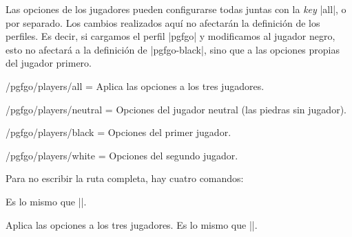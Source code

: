 \begin{goban}[9, stone = {radius = 4pt}, mark = {line = {color = red}}]
Las opciones de los jugadores pueden configurarse todas juntas con la \emph{key} |all|, o por separado. Los cambios realizados aquí no afectarán la definición de los perfiles. Es decir, si cargamos el perfil |pgfgo| y modificamos al jugador negro, esto no afectar\'a a la definici\'on de |pgfgo-black|, sino que a las opciones propias del jugador primero.

\begin{key}{/pgfgo/players/all = }
	Aplica las opciones a los tres jugadores.
\end{key}

\begin{key}{/pgfgo/players/neutral = }
	Opciones del jugador neutral (las piedras sin jugador).
\end{key}

\begin{key}{/pgfgo/players/black = }
	Opciones del primer jugador.
\end{key}

\begin{key}{/pgfgo/players/white = }
	Opciones del segundo jugador.

	\begin{codeexample}[width=4cm]

		\begin{goban}[3]
		\end{goban}
	\end{codeexample}
\end{key}

Para no escribir la ruta completa, hay cuatro comandos:

\begin{command}{\pgfgosetplayer{}}
	Es lo mismo que ||.
\end{command}

\begin{command}{\pgfgosetallplayers{}}
	Aplica las opciones a los tres jugadores. Es lo mismo que ||.

	\begin{codeexample}[width=4cm]


\end{codeexample}
\end{command}
\end{goban}
